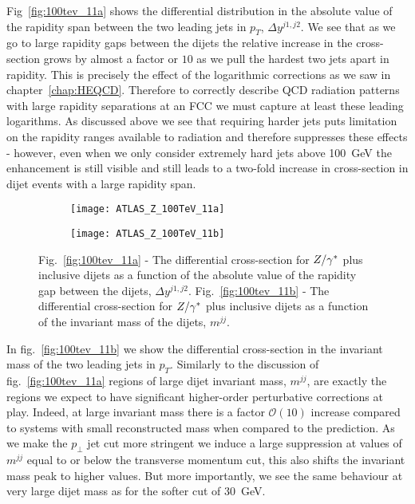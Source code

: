 	Fig~\eqref{fig:100tev_11a} shows the differential distribution in the absolute value of the
	rapidity span between the two leading jets in $p_T$, $\Delta y^{j1, j2}$.  We see that as we go to
	large rapidity gaps between the dijets the relative increase in the cross-section grows by almost a
	factor or $10$ as we pull the hardest two jets apart in rapidity.  This is precisely the effect of
	the logarithmic corrections as we saw in chapter~\ref{chap:HEQCD}.
	Therefore to correctly describe QCD radiation patterns with large rapidity separations at an FCC
	we must capture at least these leading logarithms.  As discussed above we see that requiring harder
	jets puts limitation on the rapidity ranges available to radiation and therefore suppresses these
	effects - however, even when we only consider extremely hard jets above 100~GeV the enhancement is
	still visible and still leads to a two-fold increase in cross-section in dijet events with a large
	rapidity span.

	\begin{figure}[bth]
		\centering
		\begin{subfigure}[b]{0.49\textwidth}
			\texttt{[image: ATLAS\_Z\_100TeV\_11a]}
			\caption{}
			\label{fig:100tev_11a}
		\end{subfigure}
		\begin{subfigure}[b]{0.49\textwidth}
			\texttt{[image: ATLAS\_Z\_100TeV\_11b]}
			\caption{}
			\label{fig:100tev_11b}
		\end{subfigure}
		\caption{Fig.~\eqref{fig:100tev_11a} - The differential cross-section for $Z/\gamma^*$ plus inclusive dijets as a function
		of the absolute value of the rapidity gap between the dijets, $\Delta y^{j1, j2}$. Fig.~\eqref{fig:100tev_11b} -
		The differential cross-section for $Z/\gamma^*$ plus inclusive dijets as a function of the invariant mass of the dijets, $m^{jj}$.}
	\end{figure}

	In fig.~\eqref{fig:100tev_11b} we show the differential cross-section in the invariant mass of the two leading
	jets in $p_T$.  Similarly to the discussion of fig.~\eqref{fig:100tev_11a} regions of large dijet invariant mass,
	$m^{jj}$, are exactly the regions we expect to have significant higher-order perturbative corrections at play.
	Indeed, at large invariant mass there is a factor $\mathcal{O}(10)$ increase compared to systems with small
	reconstructed mass when compared to the \stev prediction.  As we make the $p_\perp$ jet cut more stringent
	we induce a large suppression at values of $m^{jj}$ equal to or below the transverse momentum cut, this also
	shifts the invariant mass peak to higher values.  But more importantly, we see the same behaviour at very
	large dijet mass as for the softer cut of 30~GeV.

